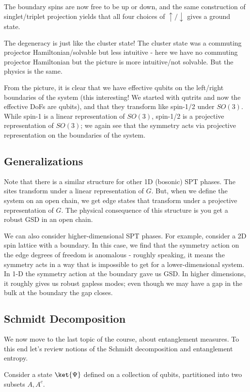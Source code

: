 The boundary spins are now free to be up or down, and the same construction of singlet/triplet projection yields that all four choices of $\uparrow/\downarrow$ gives a ground state.

The degeneracy is just like the cluster state! The cluster state was a commuting projector Hamiltonian/solvable but less intuitive - here we have no commuting projector Hamiltonian but the picture is more intuitive/not solvable. But the physics is the same.

From the picture, it is clear that we have effective qubits on the left/right boundaries of the system (this interesting! We started with qutrits and now the effective DoFs are qubits), and that they transform like spin-1/2 under $SO(3)$. While spin-1 is a linear representation of $SO(3)$, spin-1/2 is a projective representation of $SO(3)$; we again see that the symmetry acts via projective representation on the boundaries of the system.

\subsection{Generalizations}

Note that there is a similar structure for other 1D (bosonic) SPT phases. The sites transform under a linear representation of $G$. But, when we define the system on an open chain, we get edge states that transform under a projective representation of $G$. The physical consequence of this structure is you get a robust GSD in an open chain.

We can also consider higher-dimensional SPT phases. For example, consider a 2D spin lattice with a boundary. In this case, we find that the symmetry action on the edge degrees of freedom is anomalous - roughly speaking, it means the symmetry acts in a way that is impossible to get for a lower-dimensional system. In 1-D the symmetry action at the boundary gave us GSD. In higher dimensions, it roughly gives us robust gapless modes; even though we may have a gap in the bulk at the boundary the gap closes.

\subsection{Schmidt Decomposition}
We now move to the last topic of the course, about entanglement measures. To this end let's review notions of the Schmidt decomposition and entanglement entropy.

Consider a state $\ket{\Psi}$ defined on a collection of qubits, partitioned into two subsets $A, A^c$.

